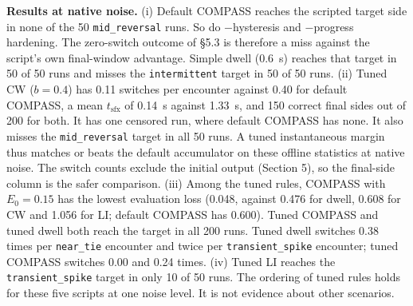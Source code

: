 \documentclass[11pt]{article}
\newcommand{\code}[1]{\texttt{#1}}
\begin{document}
\noindent\textbf{Results at native noise.} (i) Default COMPASS reaches the scripted target side in none of the 50 \code{mid\_reversal} runs. So do $-$hysteresis and $-$progress hardening. The zero-switch outcome of \S5.3 is therefore a miss against the script's own final-window advantage. Simple dwell (0.6~s) reaches that target in 50 of 50 runs and misses the \code{intermittent} target in 50 of 50 runs. (ii) Tuned CW ($b=0.4$) has 0.11 switches per encounter against 0.40 for default COMPASS, a mean $t_{\text{sfx}}$ of 0.14~s against 1.33~s, and 150 correct final sides out of 200 for both. It has one censored run, where default COMPASS has none. It also misses the \code{mid\_reversal} target in all 50 runs. A tuned instantaneous margin thus matches or beats the default accumulator on these offline statistics at native noise. The switch counts exclude the initial output (Section 5), so the final-side column is the safer comparison. (iii) Among the tuned rules, COMPASS with $E_0=0.15$ has the lowest evaluation loss (0.048, against 0.476 for dwell, 0.608 for CW and 1.056 for LI; default COMPASS has 0.600). Tuned COMPASS and tuned dwell both reach the target in all 200 runs. Tuned dwell switches 0.38 times per \code{near\_tie} encounter and twice per \code{transient\_spike} encounter; tuned COMPASS switches 0.00 and 0.24 times. (iv) Tuned LI reaches the \code{transient\_spike} target in only 10 of 50 runs. The ordering of tuned rules holds for these five scripts at one noise level. It is not evidence about other scenarios.
\end{document}
